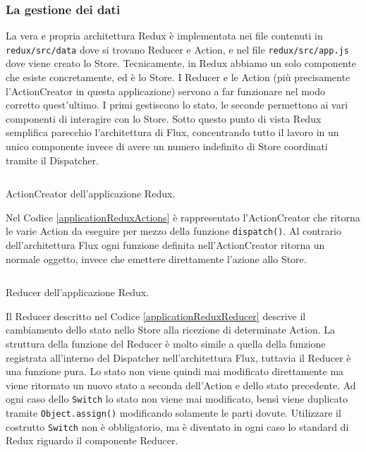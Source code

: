 \subsubsection*{La gestione dei dati}
La vera e propria architettura Redux è implementata nei file contenuti in \texttt{redux/src/data} dove si trovano Reducer e Action, e nel file \texttt{redux/src/app.js} dove viene creato lo Store. Tecnicamente, in Redux abbiamo un solo componente che esiste concretamente, ed è lo Store. I Reducer e le Action (più precisamente l'ActionCreator in questa applicazione) servono a far funzionare nel modo corretto quest'ultimo. I primi gestiscono lo stato, le seconde permettono ai vari componenti di interagire con lo Store.
Sotto questo punto di vista Redux semplifica parecchio l'architettura di Flux, concentrando tutto il lavoro in un unico componente invece di avere un numero indefinito di Store coordinati tramite il Dispatcher.

\begin{listing}[ht]
\inputminted{javascript}{sources/applicationReduxActions.js}
\caption{ActionCreator dell'applicazione Redux.} 
\label{applicationReduxActions} 
\end{listing}

Nel Codice \ref{applicationReduxActions} è rappresentato l'ActionCreator che ritorna le varie Action da eseguire per mezzo della funzione \texttt{dispatch()}. Al contrario dell'architettura Flux ogni funzione definita nell'ActionCreator ritorna un normale oggetto, invece che emettere direttamente l'azione allo Store.

\begin{listing}[ht]
\inputminted{javascript}{sources/applicationReduxReducer.js}
\caption{Reducer dell'applicazione Redux.} 
\label{applicationReduxReducer} 
\end{listing}

Il Reducer descritto nel Codice \ref{applicationReduxReducer} descrive il cambiamento dello stato nello Store alla ricezione di determinate Action. La struttura della funzione del Reducer è molto simile a quella della funzione registrata all'interno del Dispatcher nell'architettura Flux, tuttavia il Reducer è una funzione pura. Lo stato non viene quindi mai modificato direttamente ma viene ritornato un nuovo stato a seconda dell'Action e dello stato precedente.
Ad ogni caso dello \texttt{Switch} lo stato non viene mai modificato, bensì viene duplicato tramite \texttt{Object.assign()} modificando solamente le parti dovute.
Utilizzare il costrutto \texttt{Switch} non è obbligatorio, ma è diventato in ogni caso lo standard di Redux riguardo il componente Reducer. 

